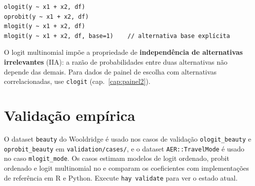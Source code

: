 \begin{lstlisting}
ologit(y ~ x1 + x2, df)
oprobit(y ~ x1 + x2, df)
mlogit(y ~ x1 + x2, df)
mlogit(y ~ x1 + x2, df, base=1)    // alternativa base explícita
\end{lstlisting}

\begin{nota}
  O logit multinomial impõe a propriedade de \textbf{independência de
  alternativas irrelevantes} (IIA): a razão de probabilidades entre duas
  alternativas não depende das demais. Para dados de painel de escolha com
  alternativas correlacionadas, use \lstinline{clogit} (cap.~\ref{cap:painel2}).
\end{nota}

\section{Validação empírica}

O dataset \texttt{beauty} do Wooldridge é usado nos casos de validação
\texttt{ologit\_beauty} e \texttt{oprobit\_beauty} em \texttt{validation/cases/},
e o dataset \texttt{AER::TravelMode} é usado no caso \texttt{mlogit\_mode}. Os
casos estimam modelos de logit ordenado, probit ordenado e logit multinomial
no \hayashi{} e comparam os coeficientes com implementações de referência em R
e Python. Execute \lstinline{hay validate} para ver o estado atual.
